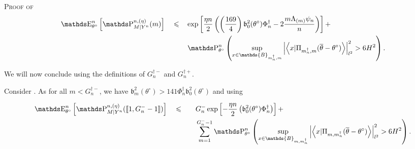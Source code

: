 \begin{pro}{\textsc{Proof of } \\}
\begin{alignat}{3}
& \E_{\theta^{\circ}}^{n}\left[\P_{M \vert Y^{n}}^{n, (\eta)}(m)\right] && \leq &&  \exp \left[\frac{\eta n}{2}\left(\left(\frac{169}{4}\right) \mathfrak{b}_{0}^{2}(\theta^{\circ}) \Phi^{\dagger}_{n} - 2 \frac{m \Lambda_{(m)} \psi_{n}}{n} \right)\right] + \notag\\
& && && \P_{\theta^{\circ}}^{n}\left(\sup\limits_{x \in \mathds{B}_{m^{\dagger}_{n}, m}} \left\vert \left\langle x \vert \Pi_{m^{\dagger}_{n}, m} (\overline{\theta} - \theta^{\circ}) \right\rangle \right\vert_{l^{2}}^{2} > 6H^{2}\right).\label{EQD.36}
\end{alignat}


\bigskip

We will now conclude using the definitions of $G^{\dagger -}_{n}$ and $G^{\dagger +}_{n}$.

Consider .
As for all $m < G^{\dagger -}_{n}$, we have $\mathfrak{b}_{m}^{2}(\theta^{\circ}) > 141 \Phi^{\dagger}_{n} \mathfrak{b}_{0}^{2}(\theta^{\circ})$ and using 


\begin{alignat*}{4}
& \E_{\theta^{\circ}}^{n}\left[\P_{M \vert Y^{n}}^{n, (\eta)}(\llbracket 1, G^{-}_{n} - 1 \rrbracket)\right]&& \leq && && G^{-}_{n} \exp \left[- \frac{\eta n}{2}\left( \mathfrak{b}_{0}^{2}(\theta^{\circ}) \Phi^{\dagger}_{n} \right)\right] + \notag\\
& && && && \sum\limits_{m = 1}^{G^{-}_{n} - 1} \P_{\theta^{\circ}}^{n}\left(\sup\limits_{x \in \mathds{B}_{m, m^{\dagger}_{n}}} \left\vert \left\langle x \vert \Pi_{m, m^{\dagger}_{n}} (\overline{\theta} - \theta^{\circ}) \right\rangle \right\vert_{l^{2}}^{2} > 6H^{2}\right).
\end{alignat*}



\end{pro}
